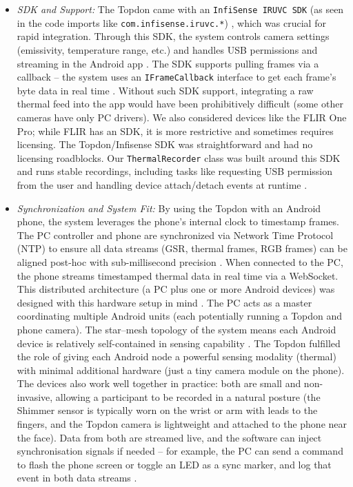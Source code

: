 \documentclass{report}
\begin{document}
\begin{itemize}
	\item \textit{SDK and Support:} The Topdon came with an \texttt{InfiSense IRUVC SDK} (as seen in the code imports like \texttt{com.infisense.iruvc.*}) \cite{infisense16}, which was crucial for rapid integration. Through this SDK, the system controls camera settings (emissivity, temperature range, etc.) and handles USB permissions and streaming in the Android app \cite{infisense16}. The SDK supports pulling frames via a callback -- the system uses an \texttt{IFrameCallback} interface to get each frame's byte data in real time \cite{infisense16}. Without such SDK support, integrating a raw thermal feed into the app would have been prohibitively difficult (some other cameras have only PC drivers). We also considered devices like the FLIR One Pro; while FLIR has an SDK, it is more restrictive and sometimes requires licensing. The Topdon/Infisense SDK was straightforward and had no licensing roadblocks. Our \texttt{ThermalRecorder} class was built around this SDK and runs stable recordings, including tasks like requesting USB permission from the user and handling device attach/detach events at runtime \cite{infisense16}.

	\item \textit{Synchronization and System Fit:} By using the Topdon with an Android phone, the system leverages the phone's internal clock to timestamp frames. The PC controller and phone are synchronized via Network Time Protocol (NTP) to ensure all data streams (GSR, thermal frames, RGB frames) can be aligned post-hoc with sub-millisecond precision \cite{shimmerapi15}. When connected to the PC, the phone streams timestamped thermal data in real time via a WebSocket. This distributed architecture (a PC plus one or more Android devices) was designed with this hardware setup in mind \cite{shimmerapi15}. The PC acts as a master coordinating multiple Android units (each potentially running a Topdon and phone camera). The star--mesh topology of the system means each Android device is relatively self-contained in sensing capability \cite{shimmerapi15}. The Topdon fulfilled the role of giving each Android node a powerful sensing modality (thermal) with minimal additional hardware (just a tiny camera module on the phone). The devices also work well together in practice: both are small and non-invasive, allowing a participant to be recorded in a natural posture (the Shimmer sensor is typically worn on the wrist or arm with leads to the fingers, and the Topdon camera is lightweight and attached to the phone near the face). Data from both are streamed live, and the software can inject synchronisation signals if needed -- for example, the PC can send a command to flash the phone screen or toggle an LED as a sync marker, and log that event in both data streams \cite{syncmarker21}.
\end{itemize}
\end{document}
